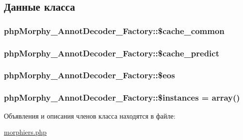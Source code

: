 \subsection{Данные класса}
\hypertarget{classphpMorphy__AnnotDecoder__Factory_a0a5545fa66a128b4a663a22927d6f205}{
\subsubsection[{\$cache\_\-common}]{\setlength{\rightskip}{0pt plus 5cm}phpMorphy\_\-AnnotDecoder\_\-Factory::\$cache\_\-common}}
\label{classphpMorphy__AnnotDecoder__Factory_a0a5545fa66a128b4a663a22927d6f205}
\hypertarget{classphpMorphy__AnnotDecoder__Factory_ac23ade1051f2fabc200a93872d4b28a1}{
\subsubsection[{\$cache\_\-predict}]{\setlength{\rightskip}{0pt plus 5cm}phpMorphy\_\-AnnotDecoder\_\-Factory::\$cache\_\-predict}}
\label{classphpMorphy__AnnotDecoder__Factory_ac23ade1051f2fabc200a93872d4b28a1}
\hypertarget{classphpMorphy__AnnotDecoder__Factory_a81289f035d987b9afe3cf34b628a920d}{
\subsubsection[{\$eos}]{\setlength{\rightskip}{0pt plus 5cm}phpMorphy\_\-AnnotDecoder\_\-Factory::\$eos}}
\label{classphpMorphy__AnnotDecoder__Factory_a81289f035d987b9afe3cf34b628a920d}
\hypertarget{classphpMorphy__AnnotDecoder__Factory_aff12149a8d4f63ac4b7672b76cba926d}{
\subsubsection[{\$instances}]{\setlength{\rightskip}{0pt plus 5cm}phpMorphy\_\-AnnotDecoder\_\-Factory::\$instances = array()}}
\label{classphpMorphy__AnnotDecoder__Factory_aff12149a8d4f63ac4b7672b76cba926d}


Объявления и описания членов класса находятся в файле:\begin{DoxyCompactItemize}
\item 
\hyperlink{morphiers_8php}{morphiers.php}\end{DoxyCompactItemize}
